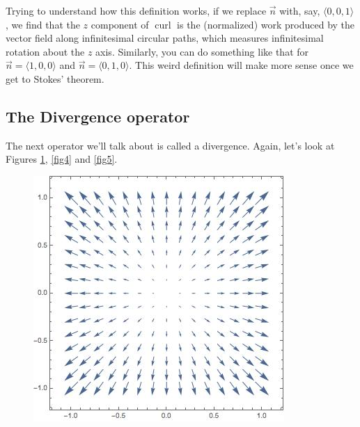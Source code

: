 \documentclass[12pt]{article}
\renewcommand{\lg}{\langle}
\newcommand{\rg}{\rangle}
\DeclareMathOperator{\curl}{curl}
\begin{document}
Trying to understand how this definition works, if we replace $\vec{n}$ with, say, $\lg 0,0,1\rg$, we find that the $z$ component of $\curl$ is the (normalized) work produced by the vector field along infinitesimal circular paths, which measures infinitesimal rotation about the $z$ axis. Similarly, you can do something like that for $\vec{n}=\lg 1,0,0\rg$ and $\vec{n}=\lg 0,1,0\rg$. This weird definition will make more sense once we get to Stokes' theorem.


\subsection*{The Divergence operator}
The next operator we'll talk about is called a divergence. Again, let's look at Figures \ref{fig3}, \ref{fig4} and \ref{fig5}.
\begin{figure}[h]
  \includegraphics[width=\linewidth]{posdiv.jpeg}
  \caption{}\label{fig3}
\endminipage\hfill
{}

\end{figure}
\end{document}
